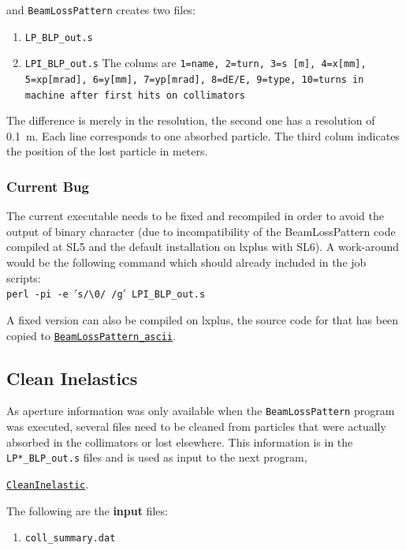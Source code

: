 \documentclass[a4paper, oneside, final]{scrartcl}
\begin{document}
{{{and \texttt{BeamLossPattern} creates two files:

\begin{enumerate}
\item \texttt{LP\_BLP\_out.s}
\item \texttt{LPI\_BLP\_out.s} The colums are \texttt{1=name, 2=turn, 3=s [m], 4=x[mm], 5=xp[mrad], 6=y[mm], 7=yp[mrad], 8=dE/E, 9=type, 10=turns in machine after first hits on collimators}
\end{enumerate}
The difference is merely in the resolution, the second one has a resolution of 0.1~m. Each line corresponds to one absorbed particle. The third colum indicates the position of the lost particle in meters. 

\subsubsection{Current Bug}
The current executable needs to be fixed and recompiled in order to avoid the output of binary character (due to incompatibility of the BeamLossPattern code compiled at SL5 and the default installation on lxplus with SL6). A work-around would be the following command which should already included in the job scripts:\\
\texttt{perl -pi -e $'$s/\textbackslash0/ /g$'$ LPI\_BLP\_out.s}\newline

A fixed version can also be compiled on lxplus, the source code for that has been copied to 
{\href{https://github.com/rkwee/LHC-Collimation/tree/master/PostSixTrack/BeamLossPattern_ascii}{\texttt{BeamLossPattern\_ascii}}}.

\subsection{Clean Inelastics}

As aperture information was only available when the \texttt{BeamLossPattern} program was executed, several files need to be cleaned from particles that were actually absorbed in the collimators or lost elsewhere. This information is in the \texttt{LP*\_BLP\_out.s} files and is used as input to the next program, {\href{https://github.com/rkwee/LHC-Collimation/tree/master/PostSixTrack/CleanInelastic}{\texttt{CleanInelastic}}.

The following are the \textbf{input} files:

\begin{enumerate}
\item \texttt{coll\_summary.dat} 


\end{enumerate}}}}}
\end{document}
